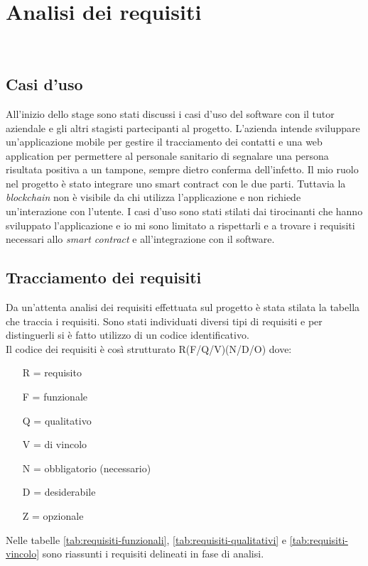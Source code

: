 
\chapter{Analisi dei requisiti}
\label{cap:analisi-requisiti}

\\

\section{Casi d'uso}
All'inizio dello stage sono stati discussi i casi d'uso del software con il tutor aziendale e gli altri stagisti partecipanti al progetto.
L'azienda intende sviluppare un'applicazione mobile per gestire il tracciamento dei contatti e una web application per permettere al personale sanitario di segnalare una persona risultata positiva a un tampone, sempre dietro conferma dell'infetto. Il mio ruolo nel progetto è stato integrare uno smart contract con le due parti. Tuttavia la \textit{blockchain} non è visibile da chi utilizza l'applicazione e non richiede un'interazione con l'utente. I casi d'uso sono stati stilati dai tirocinanti che hanno sviluppato l'applicazione e io mi sono limitato a rispettarli e a trovare i requisiti necessari allo \textit{smart contract} e all'integrazione con il software.
\section{Tracciamento dei requisiti}

Da un'attenta analisi dei requisiti effettuata sul progetto è stata stilata la tabella che traccia i requisiti. Sono stati individuati diversi tipi di requisiti e per distinguerli si è fatto utilizzo di un codice identificativo.\\
Il codice dei requisiti è così strutturato R(F/Q/V)(N/D/O) dove:
\begin{enumerate}
	\item[R =] requisito
    \item[F =] funzionale
    \item[Q =] qualitativo
    \item[V =] di vincolo
    \item[N =] obbligatorio (necessario)
    \item[D =] desiderabile
    \item[Z =] opzionale
\end{enumerate}
Nelle tabelle \ref{tab:requisiti-funzionali}, \ref{tab:requisiti-qualitativi} e \ref{tab:requisiti-vincolo} sono riassunti i requisiti delineati in fase di analisi.

